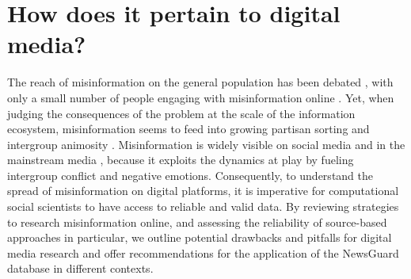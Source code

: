\documentclass[12pt]{article}
\begin{document}
\section*{How does it pertain to digital media?}
The reach of misinformation on the general population has been debated \citep{wattsMeasuringNewsIts2021b}, with only a small number of people engaging with misinformation online \citep{allenEvaluatingFakeNews2020,grinbergFakeNewsTwitter2019}. Yet, when judging the consequences of the problem at the scale of the information ecosystem, misinformation seems to feed into growing partisan sorting and intergroup animosity \citep{gonzalez-bailonAsymmetricIdeologicalSegregation2023a, robertsonUsersChooseEngage2023a}. Misinformation is widely visible on social media and in the mainstream media \citep{tsfatiCausesConsequencesMainstream2020}, because it exploits the dynamics at play by fueling intergroup conflict and negative emotions. Consequently, to understand the spread of misinformation on digital platforms, it is imperative for computational social scientists to have access to reliable and valid data. By reviewing strategies to research misinformation online, and assessing the reliability of source-based approaches in particular, we outline potential drawbacks and pitfalls for digital media research and offer recommendations for the application of the NewsGuard database in different contexts.


\end{document}
